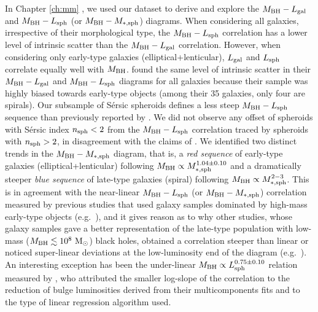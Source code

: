In Chapter \ref{ch:mm} \citep{paperII}, we used our dataset to derive and explore 
the $M_{\rm BH} - L_{\rm gal}$ and $M_{\rm BH} - L_{\rm sph}$ (or $M_{\rm BH} - M_{\rm *,sph}$) diagrams. 
When considering all galaxies, irrespective of their morphological type, 
the $M_{\rm BH} - L_{\rm sph}$ correlation has a lower level of intrinsic scatter 
than the $M_{\rm BH} - L_{\rm gal}$ correlation. 
However, when considering only early-type galaxies (elliptical+lenticular), 
$L_{\rm gal}$ and $L_{\rm sph}$ correlate equally well with $M_{\rm BH}$. 
\citet{lasker2014anal} found the same level of intrinsic scatter in their 
$M_{\rm BH} - L_{\rm gal}$ and $M_{\rm BH} - L_{\rm sph}$ diagrams for all galaxies
because their sample was highly biased towards early-type objects 
(among their 35 galaxies, only four are spirals). 
Our subsample of S\'ersic spheroids defines a less steep $M_{\rm BH} - L_{\rm sph}$ 
sequence than previously reported by \citet{grahamscott2013}. 
We did not observe any offset of spheroids with S\'ersic index $n_{\rm sph} < 2$ 
from the $M_{\rm BH} - L_{\rm sph}$ correlation traced by spheroids with $n_{\rm sph} > 2$, 
in disagreement with the claims of \citet{sani2011}. 
We identified two distinct trends in the $M_{\rm BH} - M_{\rm *,sph}$ diagram, 
that is, a \emph{red sequence} of early-type galaxies (elliptical+lenticular) 
following $M_{\rm BH} \propto M_{\rm *,sph}^{1.04 \pm 0.10}$ 
and a dramatically steeper \emph{blue sequence} of late-type galaxies (spiral) 
following $M_{\rm BH} \propto M_{\rm *,sph}^{2-3}$. 
This is in agreement with the near-linear $M_{\rm BH} - L_{\rm sph}$ (or $M_{\rm BH} - M_{\rm *,sph}$) correlation 
measured by previous studies that used galaxy samples dominated by high-mass early-type objects 
(e.g.~\citealt{magorrian1998,marconihunt2003,haringrix2004,gultelkin2009,sani2011,beifiori2012,
erwingadotti2012,vika2012}),  
and it gives reason as to why other studies, 
whose galaxy samples gave a better representation of the late-type population 
with low-mass ($M_{\rm BH} \lesssim 10^8 \rm~M_\odot$) black holes, 
obtained a correlation steeper than linear 
or noticed super-linear deviations at the low-luminosity end of the diagram 
(e.g.~\citealt{laor1998,laor2001,wandel1999,salucci2000,ryan2007}). 
An interesting exception has been the under-linear $M_{\rm BH} \propto L_{\rm sph}^{0.75 \pm 0.10}$ relation 
measured by \citet{lasker2014anal}, 
who attributed the smaller log-slope of the correlation 
to the reduction of bulge luminosities derived from their multicomponents fits 
and to the type of linear regression algorithm used. 
